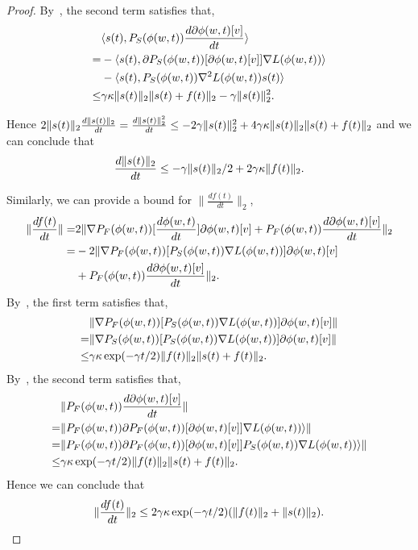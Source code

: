 \begin{proof}
By~, the second term satisfies that,
\begin{align*}
    &\langle s(t),  {P}_S(\phi(w,t))  \frac{d \partial \phi(w,t)[v]}{dt}  \rangle \\
    =& -\langle s(t),  \partial {P}_S(\phi(w,t))[\partial \phi(w,t)[v]] \nabla L(\phi(w,t))  \rangle \\
    &-\langle s(t), {P}_S(\phi(w,t)) \nabla^2 L(\phi(w,t)) s(t) \rangle \\
    \le& \gamma \kappa \| s(t) \|_2 \| s(t) + f(t) \|_2 - \gamma \| s(t) \|_2^2.
\end{align*}

Hence $2 \|s(t)\|_2 \frac{d \| s(t) \|_2}{dt} =\frac{d \| s(t) \|_2^2}{dt} \le - 2 \gamma \| s(t) \|_2^2  + 4\gamma \kappa \| s(t) \|_2 \| s(t) + f(t) \|_2$ and we can conclude that
\begin{align}
\label{eq:st}
    \frac{d\| s(t) \|_2}{dt} \le -\gamma \|s(t)\|_2 / 2 + 2 \gamma \kappa \|f(t)\|_2.
\end{align}

Similarly, we can provide a bound for  $\| \frac{d f(t)}{dt} \|_2$,
\begin{align*}
     \| \frac{d f(t) }{dt} \| 
    =& 2 \| \nabla {P}_F(\phi(w,t)) [\frac{d \phi(w,t)}{dt}] \partial \phi(w,t)[v] 
    +  {P}_F(\phi(w,t))  \frac{d \partial \phi(w,t)[v]}{dt} \|_2\\
    =& -2 \|\nabla {P}_F(\phi(w,t)) [{P}_S(\phi(w,t)) \nabla L(\phi(w,t))] \partial \phi(w,t)[v]  \\
    & +  {P}_F(\phi(w,t))  \frac{d \partial \phi(w,t)[v]}{dt}  \|_2.
\end{align*}
By~, the first term satisfies that,
\begin{align*}
    &\| \nabla {P}_F(\phi(w,t)) [{P}_S(\phi(w,t)) \nabla L(\phi(w,t))] \partial \phi(w,t)[v]  \| \\  =& \|  \nabla {P}_S(\phi(w,t)) [{P}_S(\phi(w,t)) \nabla L(\phi(w,t))] \partial \phi(w,t)[v] \| \\\le& \gamma \kappa \exp(-\gamma t /2) \| f(t) \|_2 \| s(t) + f(t) \|_2 .
\end{align*}
By~, the second term satisfies that,
\begin{align*}
    & \|   {P}_F(\phi(w,t))  \frac{d \partial \phi(w,t)[v]}{dt} \| \\
    =& \| {P}_F(\phi(w,t)) \partial {P}_F(\phi(w,t))[\partial \phi(w,t)[v]] \nabla L(\phi(w,t))  \rangle  \| \\
    =& \|{P}_F(\phi(w,t))  \partial {P}_F(\phi(w,t))[\partial \phi(w,t)[v]] {P}_S(\phi(w,t)) \nabla L(\phi(w,t))  \rangle \| \\
    \le& \gamma \kappa  \exp(-\gamma t /2) \| f(t) \|_2 \| s(t) + f(t) \|_2.
\end{align*}
Hence we can conclude that
\begin{align}
\label{eq:ft}
    \| \frac{d f(t)}{dt}  \|_2  \le  2 \gamma \kappa  \exp(-\gamma t /2)  (\|f(t)\|_2 + \| s(t)\|_2).
\end{align}


\end{proof}

